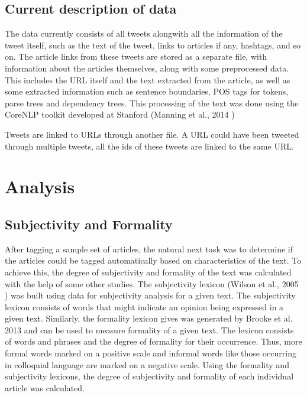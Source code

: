 \documentclass[11pt]{article}
\begin{document}
\subsection {Current description of data}

The data currently consists of all tweets alongwith all the information of the tweet itself, such as the text of the tweet, links to articles if any, hashtags, and so on. The article links from these tweets are stored as a separate file, with information about the articles themselves, along with some preprocessed data. This includes the URL itself and the text extracted from the article, as well as some extracted information such as sentence boundaries, POS tags for tokens, parse trees and dependency trees. This processing of the text was done using the CoreNLP toolkit developed at Stanford (Manning et al., 2014 \cite{manning2014stanford})

Tweets are linked to URLs through another file. A URL could have been tweeted through multiple tweets, all the ids of these tweets are linked to the same URL. 


\section{Analysis}
\subsection{Subjectivity and Formality }

After tagging a sample set of articles, the natural next task was to determine if the articles could be tagged automatically based on characteristics of the text. To achieve this, the degree of subjectivity and formality of the text was calculated with the help of some other studies. The subjectivity lexicon (Wilson et al., 2005 \cite{wilson2005recognizing}) was built using data for subjectivity analysis for a given text. The subjectivity lexicon consists of words that might indicate an opinion being expressed in a given text. Similarly, the formality lexicon gives was generated by Brooke et al. 2013 \cite{brooke2013multi} and can be used to measure formality of a given text. The lexicon consists of words and phrases and the degree of formality for their occurrence. Thus, more formal words marked on a positive scale and informal words like those occurring in colloquial language are marked on a negative scale. Using the formality and subjectivity lexicons, the degree of subjectivity and formality of each individual article was calculated. 
\end{document}

